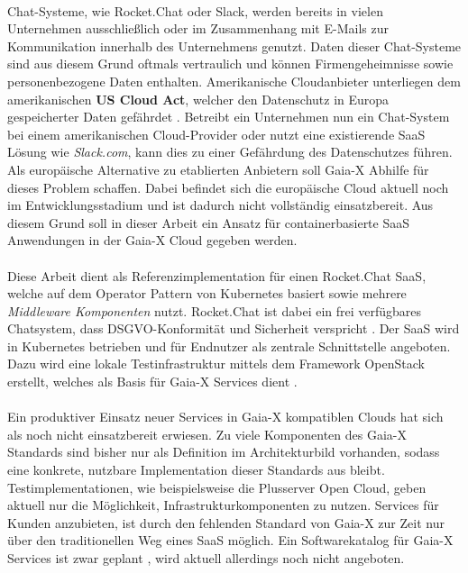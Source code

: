 \paragraph{}
Chat-Systeme, wie Rocket.Chat oder Slack, werden bereits in vielen Unternehmen ausschließlich oder im Zusammenhang mit E-Mails
zur Kommunikation innerhalb des Unternehmens genutzt. Daten dieser Chat-Systeme sind aus diesem Grund oftmals vertraulich
und können Firmengeheimnisse sowie personenbezogene Daten enthalten. 
Amerikanische Cloudanbieter unterliegen dem amerikanischen \textbf{US Cloud Act}, welcher
den Datenschutz in Europa gespeicherter Daten gefährdet \cite{Kagermann2021}.
Betreibt ein Unternehmen nun ein Chat-System bei einem amerikanischen Cloud-Provider oder nutzt eine existierende
\ac{SaaS} Lösung wie \emph{Slack.com}, kann dies zu einer Gefährdung des Datenschutzes führen.
Als europäische Alternative zu etablierten Anbietern soll Gaia-X Abhilfe für dieses Problem schaffen.
Dabei befindet sich die europäische Cloud aktuell noch im Entwicklungsstadium und ist dadurch nicht vollständig einsatzbereit.
Aus diesem Grund soll in dieser Arbeit ein Ansatz für containerbasierte \ac{SaaS} Anwendungen in der Gaia-X Cloud gegeben werden.

\paragraph{}
Diese Arbeit dient als Referenzimplementation für einen 
Rocket.Chat \ac{SaaS}, welche auf dem Operator Pattern von Kubernetes basiert sowie mehrere \emph{Middleware Komponenten} nutzt.
Rocket.Chat ist dabei ein frei verfügbares Chatsystem, dass DSGVO-Konformität und Sicherheit verspricht \cite{RocketChat}.
Der \ac{SaaS} wird in Kubernetes betrieben und für Endnutzer als zentrale Schnittstelle angeboten.
Dazu wird eine lokale Testinfrastruktur mittels dem Framework OpenStack erstellt,
welches als Basis für Gaia-X Services dient \cite{scs}.

\paragraph{}
Ein produktiver Einsatz neuer Services in Gaia-X kompatiblen Clouds hat sich als noch nicht einsatzbereit erwiesen.
Zu viele Komponenten des Gaia-X Standards sind bisher nur als Definition im Architekturbild vorhanden, sodass eine konkrete,
nutzbare Implementation dieser Standards aus bleibt. 
Testimplementationen, wie beispielsweise die Plusserver Open Cloud, geben aktuell nur die Möglichkeit,
Infrastrukturkomponenten zu nutzen.
Services für Kunden anzubieten, ist durch den fehlenden Standard von Gaia-X zur Zeit nur über den traditionellen Weg eines
\ac{SaaS} möglich.
Ein Softwarekatalog für Gaia-X Services ist zwar geplant \cite{BMWi2019},
wird aktuell allerdings noch nicht angeboten.

